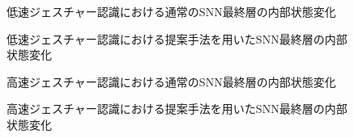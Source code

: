\begin{figure}[htbp] %
    \centering
    
    \label{fig:discussion:snn:a5}
    \caption{
        低速ジェスチャー認識における通常のSNN最終層の内部状態変化
    }
\end{figure}

\begin{figure}[htbp] %
    \centering
    
    \label{fig:discussion:dyna:a5}
    \caption{
        低速ジェスチャー認識における提案手法を用いたSNN最終層の内部状態変化
    }
\end{figure}

\begin{figure}[htbp] %
    \centering
    
    \label{fig:discussion:snn:a05}
    \caption{
        高速ジェスチャー認識における通常のSNN最終層の内部状態変化
    }
\end{figure}

\begin{figure}[htbp] %
    \centering
    
    \label{fig:discussion:dyna:a05}
    \caption{
        高速ジェスチャー認識における提案手法を用いたSNN最終層の内部状態変化
    }
\end{figure}


\clearpage